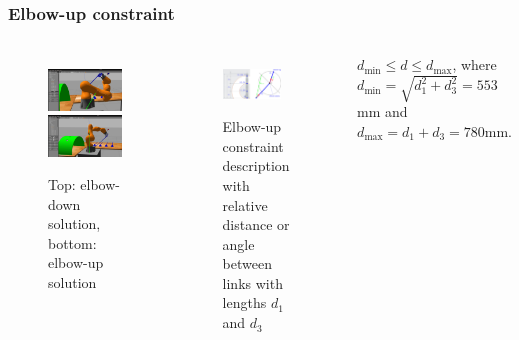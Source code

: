 \begin{frame}
\frametitle{Elbow-up constraint}
\begin{columns}
\begin{figure}[htbp]
\centering
\includegraphics[width=\textwidth]{../images/elbow-down.png}\\
\includegraphics[width=\textwidth]{../images/elbow-up.png}\\
\caption{Top: elbow-down solution, bottom: elbow-up solution}
\label{elbow-up-vs-down}
\end{figure}

\begin{figure}[htbp]
\centering
\includegraphics[width=0.8\textwidth]{../images/elbow-up-constraint-geometry.png}\\
\caption{Elbow-up constraint description with relative distance or angle between links with lengths $d_1$ and $d_3$}
\label{elbow-up-constraint-geometry}
\end{figure}

\begin{center}
$d_{\min} \leq d \leq d_{\max}$,
where
$d_{\min} = \sqrt{d_1^2 + d_3^2} = 553$mm and $d_{\max} = d_1 + d_3 = 780\mbox{mm}.$
\end{center}
\end{columns}
\end{frame}
